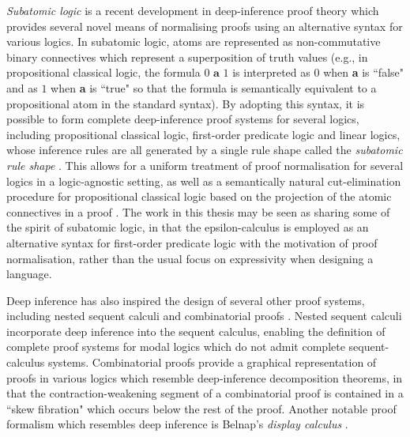 \documentclass[10pt]{article}
\theoremstyle{definition}\newtheorem{remark}[theorem]{Remark}
\theoremstyle{definition}\newtheorem{example}[theorem]{Example}
\theoremstyle{definition}\newtheorem{definition}[theorem]{Definition}
\begin{document}
	\textit{Subatomic logic} \cite{AndreaThesis, AndreaAlessioSplittableSystems, ChrisAlessioDecisionTrees} is a recent development in deep-inference proof theory which provides several novel means of normalising proofs using an alternative syntax for various logics. In subatomic logic, atoms are represented as non-commutative binary connectives which represent a superposition of truth values (e.g., in propositional classical logic, the formula $0 \,\, \textbf{a} \,\, 1$ is interpreted as $0$ when \textbf{a} is ``false" and as $1$ when \textbf{a} is ``true" so that the formula is semantically equivalent to a propositional atom in the standard syntax). By adopting this syntax, it is possible to form complete deep-inference proof systems for several logics, including propositional classical logic, first-order predicate logic and linear logics, whose inference rules are all generated by a single rule shape called the \textit{subatomic rule shape} \cite{AndreaThesis, AndreaAlessioSplittableSystems}. This allows for a uniform treatment of proof normalisation for several logics in a logic-agnostic setting, as well as a semantically natural cut-elimination procedure for propositional classical logic based on the projection of the atomic connectives in a proof \cite{ChrisAlessioDecisionTrees}. The work in this thesis may be seen as sharing some of the spirit of subatomic logic, in that the epsilon-calculus is employed as an alternative syntax for first-order predicate logic with the motivation of proof normalisation, rather than the usual focus on expressivity when designing a language.
	
	Deep inference has also inspired the design of several other proof systems, including nested sequent calculi \cite{KaiNestedSequents} and combinatorial proofs \cite{HughesFirstOrderCombinatorialProofs, HughesProofsWithoutSyntax}. Nested sequent calculi incorporate deep inference into the sequent calculus, enabling the definition of complete proof systems for modal logics which do not admit complete sequent-calculus systems. Combinatorial proofs provide a graphical representation of proofs in various logics which resemble deep-inference decomposition theorems, in that the contraction-weakening segment of a combinatorial proof is contained in a ``skew fibration" which occurs below the rest of the proof. Another notable proof formalism which resembles deep inference is Belnap's \textit{display calculus} \cite{LyonDisplayCalculi}.
	
\end{document}
